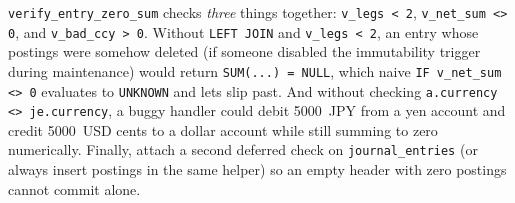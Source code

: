 \begin{trapbox}
\texttt{verify\_entry\_zero\_sum} checks \emph{three} things
together: \texttt{v\_legs < 2}, \texttt{v\_net\_sum <> 0}, and
\texttt{v\_bad\_ccy > 0}. Without \texttt{LEFT JOIN} and \texttt{v\_legs < 2}, an
entry whose postings were somehow deleted (if someone disabled the immutability
trigger during maintenance) would return \texttt{SUM(...) = NULL}, which naive
\texttt{IF v\_net\_sum <> 0} evaluates to \texttt{UNKNOWN} and lets slip past. And
without checking \texttt{a.currency <> je.currency}, a buggy handler could debit
5000~JPY from a yen account and credit 5000~USD cents to a dollar account while
still summing to zero numerically. Finally, attach a second deferred check on
\texttt{journal\_entries} (or always insert postings in the same helper) so an
empty header with zero postings cannot commit alone.
\end{trapbox}

